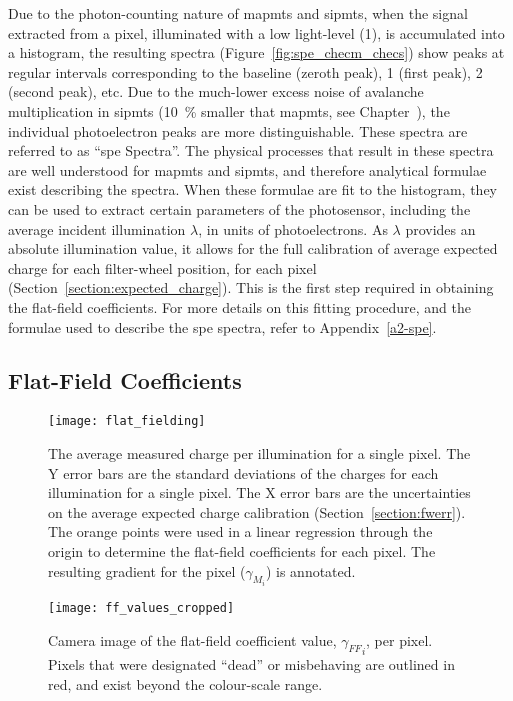 Due to the photon-counting nature of \glspl{mapmt} and \glspl{sipmt}, when the signal extracted from a pixel, illuminated with a low light-level (\utilde\SI{1}{\pe}), is accumulated into a histogram, the resulting spectra (Figure~\ref{fig:spe_checm_checs}) show peaks at regular intervals corresponding to the baseline (zeroth peak), \SI{1}{\pe} (first peak), \SI{2}{\pe} (second peak), etc. Due to the much-lower excess noise of avalanche multiplication in \glspl{sipmt} (\SI{10}{\percent} smaller that \glspl{mapmt}, see Chapter~), the individual photoelectron peaks are more distinguishable. These spectra are referred to as ``\gls{spe} Spectra''. The physical processes that result in these spectra are well understood for \glspl{mapmt} and \glspl{sipmt}, and therefore analytical formulae  exist describing the spectra. When these formulae are fit to the histogram, they can be used to extract certain parameters of the photosensor, including the average incident illumination $\lambda$, in units of photoelectrons. As $\lambda$ provides an absolute illumination value, it allows for the full calibration of average expected charge for each filter-wheel position, for each pixel (Section~\ref{section:expected_charge}). This is the first step required in obtaining the flat-field coefficients. For more details on this fitting procedure, and the formulae used to describe the \gls{spe} spectra, refer to Appendix~\ref{a2-spe}.

\subsection{Flat-Field Coefficients}

\begin{figure}
	\centering
    \texttt{[image: flat\_fielding]} 
	\caption[Flat-field calibration]{The average measured charge per illumination for a single pixel. The Y error bars are the standard deviations of the charges for each illumination for a single pixel. The X error bars are the uncertainties on the average expected charge calibration (Section~\ref{section:fwerr}). The orange points were used in a linear regression through the origin to determine the flat-field coefficients for each pixel. The resulting gradient for the pixel ($\gamma_{M_i}$) is annotated.} 
	\label{fig:flat_fielding}
\end{figure}

\begin{figure}
	\centering
    \texttt{[image: ff\_values\_cropped]} 
	\caption[Flat-field Coefficients]{Camera image of the flat-field coefficient value, ${\gamma_{FF}}_i$, per pixel. Pixels that were designated ``dead'' or misbehaving are outlined in red, and exist beyond the colour-scale range.}
	\label{fig:ff_values}
\end{figure}

